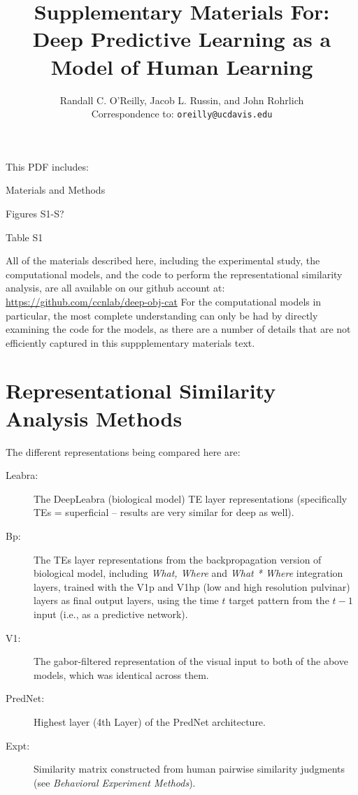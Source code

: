 \documentclass[12pt,twoside]{article}
\title{ Supplementary Materials For:\\
Deep Predictive Learning as a Model of Human Learning }
\author{Randall C. O'Reilly, Jacob L. Russin, and John Rohrlich\\
  Correspondence to: \texttt{oreilly@ucdavis.edu}\\}
\newif\myifpdf
\begin{document}
\sloppy
\raggedbottom

\maketitle 

\noindent This PDF includes:
\begin{description}
\item Materials and Methods
\item Figures S1-S?
\item Table S1
\end{description}

\clearpage

\pagestyle{myheadings}

All of the materials described here, including the experimental study, the computational models, and the code to perform the representational similarity analysis, are all available on our github account at: \url{https://github.com/ccnlab/deep-obj-cat}  For the computational models in particular, the most complete understanding can only be had by directly examining the code for the models, as there are a number of details that are not efficiently captured in this suppplementary materials text.

\section{Representational Similarity Analysis Methods}

The different representations being compared here are:
\begin{description}
\item[Leabra:] The DeepLeabra (biological model) TE layer representations (specifically TEs = superficial -- results are very similar for deep as well).
\item[Bp:] The TEs layer representations from the backpropagation version of biological model, including {\em What, Where} and {\em What * Where} integration layers, trained with the V1p and V1hp (low and high resolution pulvinar) layers as final output layers, using the time $t$ target pattern from the $t-1$ input (i.e., as a predictive network).
\item[V1:] The gabor-filtered representation of the visual input to both of the above models, which was identical across them.
\item[PredNet:] Highest layer (4th Layer) of the PredNet architecture.

\item[Expt:] Similarity matrix constructed from human pairwise similarity judgments (see {\em Behavioral Experiment Methods}).
\end{description}
\end{document}
